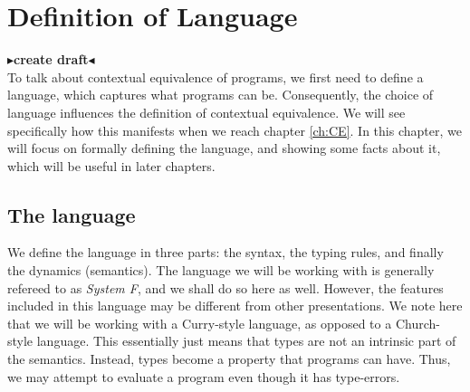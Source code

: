 \documentclass[twoside,11pt,openright]{report}
\theoremstyle{definition}
\newcommand{\todo}[1]{{\color[rgb]{.5,0,0}\textbf{$\blacktriangleright$#1$\blacktriangleleft$}}}
\begin{document}
\chapter{Definition of Language}
\label{ch:DoL}
\todo{create draft}\\
To talk about contextual equivalence of programs, we first need to define a language, which captures what programs can be. Consequently, the choice of language influences the definition of contextual equivalence. We will see specifically how this manifests when we reach chapter \ref{ch:CE}. In this chapter, we will focus on formally defining the language, and showing some facts about it, which will be useful in later chapters.
\section{The language}
We define the language in three parts: the syntax, the typing rules, and finally the dynamics (semantics). The language we will be working with is generally refereed to as \textit{System F}, and we shall do so here as well. However, the features included in this language may be different from other presentations. We note here that we will be working with a Curry-style language, as opposed to a Church-style language. This essentially just means that types are not an intrinsic part of the semantics. Instead, types become a property that programs can have. Thus, we may attempt to evaluate a program even though it has type-errors.
\end{document}

